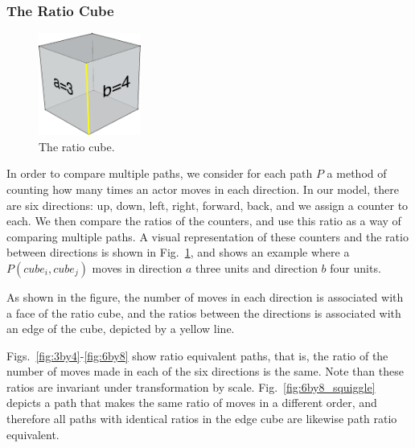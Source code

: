 \subsubsection{The Ratio Cube}

\begin{figure}
  \centering
    \includegraphics[width=0.3\textwidth]{./figures/ratioCube_3_4}
      \caption{The ratio cube.}
      \label{fig:ratioCube}
\end{figure}
In order to compare multiple paths, we consider for each path $P$ a method of counting how many times an actor moves in each direction.  
In our model, there are six directions: up, down, left, right, forward, back, and we assign a counter to each.
We then compare the ratios of the counters, and use this ratio as a way of comparing multiple paths.
A visual representation of these counters and the ratio between directions is shown in Fig.~\ref{fig:ratioCube}, and shows an example where a $P(cube_i, cube_j)$ moves in direction $a$ three units and direction $b$ four units.

As shown in the figure, the number of moves in each direction is associated with a face of the ratio cube, and the ratios between the directions is associated with an edge of the cube, depicted by a yellow line.


Figs.~\ref{fig:3by4}-\ref{fig:6by8} show ratio equivalent paths, that is, the ratio of the number of moves made in each of the six directions is the same.
Note than these ratios are invariant under transformation by scale.
Fig.~\ref{fig:6by8_squiggle} depicts a path that makes the same ratio of moves in a different order, and therefore all paths with identical ratios in the edge cube are likewise path ratio equivalent.


